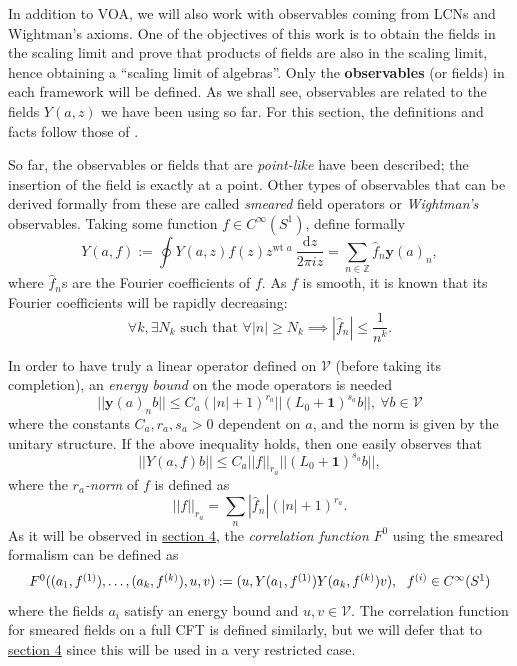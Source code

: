 \documentclass[twoside,11pt,titlepage]{amsart}
\renewcommand{\=}[1]{\stackrel{#1}{=}} %
\theoremstyle{definition}
\theoremstyle{remark}
\begin{document}
\hfill \break
In addition to VOA, we will also work with observables coming from LCNs and Wightman's axioms. One of the objectives of this work is to obtain the fields in the scaling limit and prove that products of fields are also in the scaling limit, hence obtaining a ``scaling limit of algebras''. Only the \textbf{observables} (or fields) in each framework will be defined. As we shall see, observables are related to the fields $Y(a,z)$ we have been using so far. For this section, the definitions and facts follow those of \cite{carpi2015vertex}.


So far, the observables or fields that are \textit{point-like} have been described; the insertion of the field is exactly at a point. Other types of observables that can be derived formally from these are called \textit{smeared} field operators or \textit{Wightman's} observables. Taking some function $f \in C^\infty(S^1)$, define formally
$$Y(a,f):=\oint Y(a,z)f(z)z^{\text{wt }a} \ \frac{\text{d}z}{2\pi i z}=\sum_{n \in \mathbb{Z}} \hat{f}_n\textbf{y}(a)_n,$$
where $\hat{f}_n$s are the Fourier coefficients of $f$. As $f$ is smooth, it is known that its Fourier coefficients will be rapidly decreasing:
$$\forall k , \exists N_k \text{  such that   } \forall |n| \ge N_k \implies |\hat{f}_n| \le \frac{1}{n^k}.$$

In order to have truly a linear operator defined on $\mathcal{V}$ (before taking its completion), an \textit{energy bound} on the mode operators is needed
$$||\textbf{y}(a)_nb|| \le C_a(|n|+1)^{r_a}||(L_0+\textbf{1})^{s_a}b||, \  \forall b \in \mathcal{V}$$
where the constants $C_a,r_a,s_a>0$ dependent on $a$, and the norm is given by the unitary structure. If the above inequality holds, then one easily observes that 
$$||Y(a,f)b||\le C_a||f||_{r_a}||(L_0+\textbf{1})^{s_a}b||,$$
where the $r_a$\textit{-norm} of $f$ is defined as
$$||f||_{r_a}=\sum_n |\hat{f}_n|(|n|+1)^{r_a}.$$
As it will be observed in \hyperref[4]{section 4}, the \textit{correlation function} $F^0$ using the smeared formalism can be defined as
\begin{gather*}
\scalebox{0.95}{$
F^0((a_1,f^{(1)}),\ldots,(a_k,f^{(k)}),u,v):=(u,Y(a_1,f^{(1)})Y(a_k,f^{(k)})v), \ \ f^{(i)} \in C^\infty(S^1)$}
\end{gather*}
where the fields $a_i$ satisfy an energy bound and $u,v \in \mathcal{V}$. The correlation function for smeared fields on a full CFT is defined similarly, but we will defer that to \hyperref[4]{section 4} since this will be used in a very restricted case.
\end{document}
